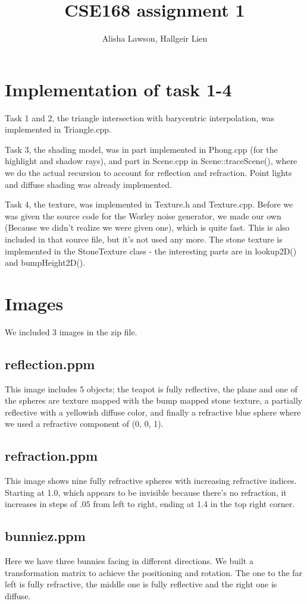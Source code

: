 \documentclass{article} %
\title{CSE168 assignment 1}
\author{Alisha Lawson, Hallgeir Lien}
\date{} %
\begin{document}
\maketitle

\section{Implementation of task 1-4}
Task 1 and 2, the triangle intersection with barycentric interpolation, was implemented in Triangle.cpp.

Task 3, the shading model, was in part implemented in Phong.cpp (for the highlight and shadow rays), and part in Scene.cpp in Scene::traceScene(), where we do the actual recursion to account for reflection and refraction. Point lights and diffuse shading was already implemented.

Task 4, the texture, was implemented in Texture.h and Texture.cpp. Before we was given the source code for the Worley noise generator, we made our own (Because we didn't realize we were given one), which is quite fast. This is also included in that source file, but it's not used any more. The stone texture is implemented in the StoneTexture class - the interesting parts are in lookup2D() and bumpHeight2D().

\section{Images}
We included 3 images in the zip file.
\subsection{reflection.ppm}
This image includes 5 objects; the teapot is fully reflective, the plane and one of the spheres are texture mapped with the bump mapped stone texture, a partially reflective with a yellowish diffuse color, and finally a refractive blue sphere where we used a refractive component of (0, 0, 1).

\subsection{refraction.ppm}
This image shows nine fully refractive spheres with increasing refractive indices. Starting at 1.0, which appears to be invisible because there's no refraction, it increases in steps of $.05$ from left to right, ending at 1.4 in the top right corner.

\subsection{bunniez.ppm}
Here we have three bunnies facing in different directions. We built a transformation matrix to achieve the positioning and rotation. The one to the far left is fully refractive, the middle one is fully reflective and the right one is diffuse. 
\end{document}

